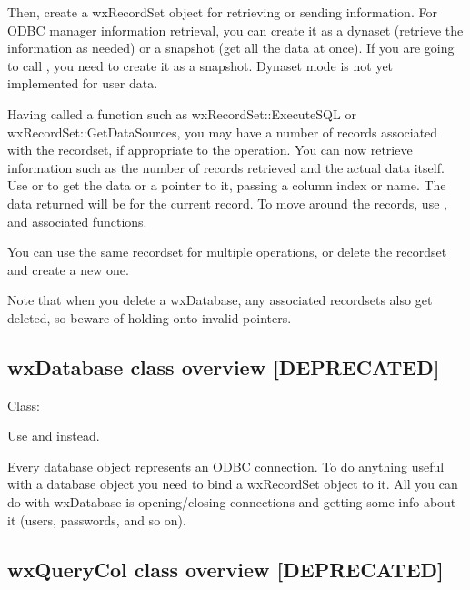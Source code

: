 Then, create a wxRecordSet object for retrieving or sending information.
For ODBC manager information retrieval, you can create it as a dynaset (retrieve the
information as needed) or a snapshot (get all the data at once).
If you are going to call , you need to create it as a snapshot.
Dynaset mode is not yet implemented for user data.

Having called a function such as wxRecordSet::ExecuteSQL or
wxRecordSet::GetDataSources, you may have a number of records
associated with the recordset, if appropriate to the operation. You can
now retrieve information such as the number of records retrieved and the
actual data itself. Use  or
 to get the data or a pointer to it, passing
a column index or name. The data returned will be for the current
record. To move around the records, use ,
\rtfsp{} and associated functions.

You can use the same recordset for multiple operations, or delete
the recordset and create a new one.

Note that when you delete a wxDatabase, any associated recordsets
also get deleted, so beware of holding onto invalid pointers.

\subsection{wxDatabase class overview [DEPRECATED]}\label{wxdatabaseoverview}

Class:  


Use  and  instead.

Every database object represents an ODBC connection. To do anything useful
with a database object you need to bind a wxRecordSet object to it. All you
can do with wxDatabase is opening/closing connections and getting some info
about it (users, passwords, and so on).



\subsection{wxQueryCol class overview [DEPRECATED]}\label{wxquerycoloverview}

